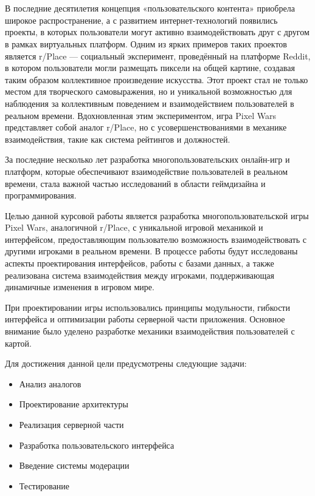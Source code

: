 \newpage

\section*{}

В последние десятилетия концепция «пользовательского контента» приобрела широкое распространение, а с развитием интернет-технологий появились проекты, в которых пользователи могут активно взаимодействовать друг с другом в рамках виртуальных платформ. Одним из ярких примеров таких проектов является r/Place — социальный эксперимент, проведённый на платформе Reddit, в котором пользователи могли размещать пиксели на общей картине, создавая таким образом коллективное произведение искусства. Этот проект стал не только местом для творческого самовыражения, но и уникальной возможностью для наблюдения за коллективным поведением и взаимодействием пользователей в реальном времени. Вдохновленная этим экспериментом, игра Pixel Wars представляет собой аналог r/Place, но с усовершенствованиями в механике взаимодействия, такие как система рейтингов и должностей.

За последние несколько лет разработка многопользовательских онлайн-игр и платформ, которые обеспечивают взаимодействие пользователей в реальном времени, стала важной частью исследований в области геймдизайна и программирования.

Целью данной курсовой работы является разработка многопользовательской игры Pixel Wars, аналогичной r/Place, с уникальной игровой механикой и интерфейсом, предоставляющим пользователю возможность взаимодействовать с другими игроками в реальном времени. В процессе работы будут исследованы аспекты проектирования интерфейсов, работы с базами данных, а также реализована система взаимодействия между игроками, поддерживающая динамичные изменения в игровом мире.

При проектировании игры использовались принципы модульности, гибкости интерфейса и оптимизации работы серверной части приложения. Основное внимание было уделено разработке механики взаимодействия пользователей с картой.

Для достижения данной цели предусмотрены следующие задачи:
\begin{itemize}
    \item Анализ аналогов
    \item Проектирование архитектуры
    \item Реализация серверной части
    \item Разработка пользовательского интерфейса
    \item Введение системы модерации
    \item Тестирование
\end{itemize}

